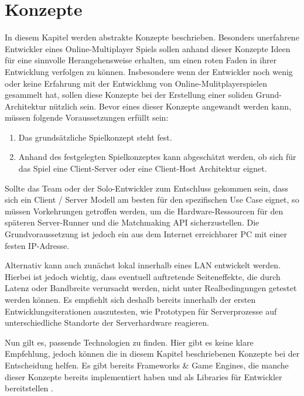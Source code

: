 \chapter{Konzepte}
\label{sec:konzepte}

In diesem Kapitel werden abstrakte Konzepte beschrieben. Besonders unerfahrene Entwickler eines Online-Multiplayer Spiels sollen anhand dieser Konzepte Ideen für eine sinnvolle Herangehensweise erhalten, um einen roten Faden in ihrer Entwicklung verfolgen zu können. Insbesondere wenn der Entwickler noch wenig oder keine Erfahrung mit der Entwicklung von Online-Mulitplayerspielen gesammelt hat, sollen diese Konzepte bei der Erstellung einer soliden Grund-Architektur nützlich sein. Bevor eines dieser Konzepte angewandt werden kann, müssen folgende Voraussetzungen erfüllt sein:

\begin{enumerate}
	\item Das grundsätzliche Spielkonzept steht fest.
	\item Anhand des festgelegten Spielkonzeptes kann abgeschätzt werden, ob sich für das Spiel eine Client-Server oder eine Client-Host Architektur eignet.
\end{enumerate}

Sollte das Team oder der Solo-Entwickler zum Entschluss gekommen sein, dass sich ein Client / Server Modell am besten für den spezifischen Use Case eignet, so müssen Vorkehrungen getroffen werden, um die Hardware-Ressourcen für den späteren Server-Runner und die Matchmaking API sicherzustellen. Die Grundvoraussetzung ist jedoch ein aus dem Internet erreichbarer PC mit einer festen IP-Adresse. 

Alternativ kann auch zunächst lokal innerhalb eines LAN entwickelt werden. Hierbei ist jedoch wichtig, dass eventuell auftretende Seiteneffekte, die durch Latenz oder Bandbreite verursacht werden, nicht unter Realbedingungen getestet werden können. Es empfiehlt sich deshalb bereits innerhalb der ersten Entwicklungsiterationen auszutesten, wie Prototypen für Serverprozesse auf unterschiedliche Standorte der Serverhardware reagieren. 

Nun gilt es, passende Technologien zu finden. Hier gibt es keine klare Empfehlung, jedoch können die in diesem Kapitel beschriebenen Konzepte bei der Entscheidung helfen. Es gibt bereits Frameworks \& Game Engines, die manche dieser Konzepte bereits implementiert haben und als Libraries für Entwickler bereitstellen \cite{MFatihMAR.2021}.

